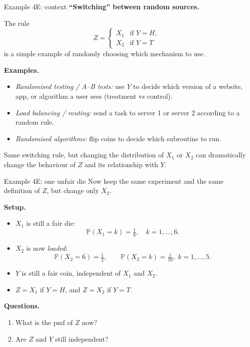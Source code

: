 \documentclass[t,8pt]{beamer}
\begin{document}
\begin{frame}{Example 4E: context}
	\small
	\textbf{“Switching” between random sources.}
	
	The rule
	\[
	Z =
	\begin{cases}
		X_1 & \text{if } Y=H,\\
		X_2 & \text{if } Y=T
	\end{cases}
	\]
	is a simple example of randomly choosing which mechanism to use.
	
	\medskip
	\textbf{Examples.}
	\begin{itemize}
		\item \emph{Randomised testing / A--B tests:}
		use $Y$ to decide which version of a website, app, or algorithm
		a user sees (treatment vs control).
		\item \emph{Load balancing / routing:}
		send a task to server 1 or server 2 according to a random rule.
		\item \emph{Randomised algorithms:}
		flip coins to decide which subroutine to run.
	\end{itemize}
	
	\medskip
	Same switching rule, but changing the distribution of $X_1$ or $X_2$
	can dramatically change the behaviour of $Z$ and its relationship with $Y$.
\end{frame}

\begin{frame}{Example 4E: one unfair die}
	\small
	Now keep the same experiment and the same definition of $Z$, but change only $X_2$.
	
	\medskip
	\textbf{Setup.}
	\begin{itemize}
		\item $X_1$ is still a fair die:
		\[
		\mathbb P(X_1=k) = \tfrac16,\quad k=1,\dots,6.
		\]
		\item $X_2$ is now \emph{loaded}:
		\[
		\mathbb P(X_2=6) = \tfrac12,\qquad
		\mathbb P(X_2=k) = \tfrac1{10},\; k=1,\dots,5.
		\]
		\item $Y$ is still a fair coin, independent of $X_1$ and $X_2$.
		\item $Z = X_1$ if $Y=H$, and $Z = X_2$ if $Y=T$.
	\end{itemize}
	
	\medskip
	\textbf{Questions.}
	\begin{enumerate}
		\item What is the pmf of $Z$ now?
		\item Are $Z$ and $Y$ still independent?
	\end{enumerate}
\end{frame}
\end{document}
